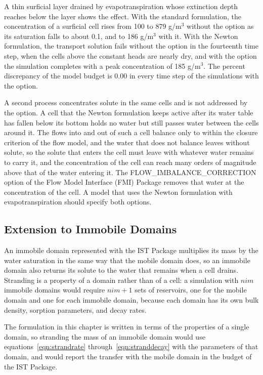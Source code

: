 A thin surficial layer drained by evapotranspiration whose extinction depth reaches below the layer shows the effect. With the standard formulation, the concentration of a surficial cell rises from 100 to 879 g/m$^3$ without the option as its saturation falls to about 0.1, and to 186 g/m$^3$ with it. With the Newton formulation, the transport solution fails without the option in the fourteenth time step, when the cells above the constant heads are nearly dry, and with the option the simulation completes with a peak concentration of 185 g/m$^3$. The percent discrepancy of the model budget is 0.00 in every time step of the simulations with the option.

A second process concentrates solute in the same cells and is not addressed by the option. A cell that the Newton formulation keeps active after its water table has fallen below its bottom holds no water but still passes water between the cells around it. The flows into and out of such a cell balance only to within the closure criterion of the flow model, and the water that does not balance leaves without solute, so the solute that enters the cell must leave with whatever water remains to carry it, and the concentration of the cell can reach many orders of magnitude above that of the water entering it. The FLOW\_IMBALANCE\_CORRECTION option of the Flow Model Interface (FMI) Package removes that water at the concentration of the cell. A model that uses the Newton formulation with evapotranspiration should specify both options.

\subsection{Extension to Immobile Domains}

An immobile domain represented with the IST Package multiplies its mass by the water saturation in the same way that the mobile domain does, so an immobile domain also returns its solute to the water that remains when a cell drains. Stranding is a property of a domain rather than of a cell: a simulation with $nim$ immobile domains would require $nim + 1$ sets of reservoirs, one for the mobile domain and one for each immobile domain, because each domain has its own bulk density, sorption parameters, and decay rates.

The formulation in this chapter is written in terms of the properties of a single domain, so stranding the mass of an immobile domain would use equations~\ref{eqn:strandrate} through~\ref{eqn:stranddecay} with the parameters of that domain, and would report the transfer with the mobile domain in the budget of the IST Package.


